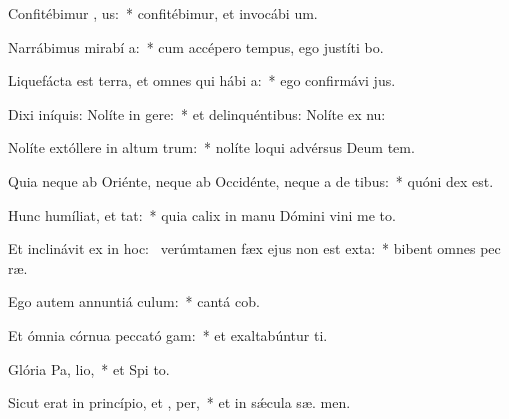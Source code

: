 \item Confitébimur , us:~* confitébimur, et invocábi  um.
\item Narrábimus mirabí a:~* cum accépero tempus, ego justíti bo.
\item Liquefácta est terra, et omnes qui hábi  a:~* ego confirmávi  jus.
\item Dixi iníquis: Nolíte in gere:~* et delinquéntibus: Nolíte ex nu:
\item Nolíte extóllere in altum  trum:~* nolíte loqui advérsus Deum tem.
\item Quia neque ab Oriénte, neque ab Occidénte, neque a de tibus:~* quóni  dex est.
\item Hunc humíliat, et  tat:~* quia calix in manu Dómini vini me  to.
\item Et inclinávit ex  in hoc:~\pscross{} verúmtamen fæx ejus non est exta:~* bibent omnes pec ræ.
\item Ego autem annuntiá  culum:~* cantá  cob.
\item Et ómnia córnua peccató gam:~* et exaltabúntur  ti.
\item Glória Pa,  lio,~* et Spi to.
\item Sicut erat in princípio, et ,  per,~* et in sǽcula sæ. men.
